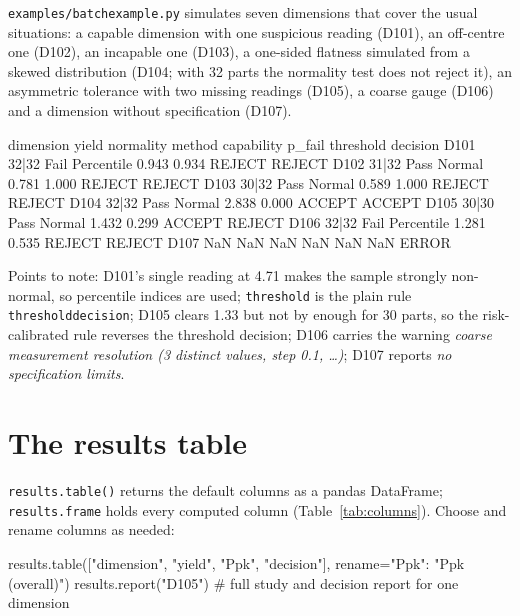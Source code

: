 \documentclass[a4paper,11pt,oneside,openany,parskip=half-,headings=standardclasses,toc=flat,numbers=noenddot]{scrbook}
\newcommand{\code}[1]{\texttt{\begingroup\def\_{\textunderscore\allowbreak}#1\endgroup}}
\newcommand{\tabref}[1]{Table~\ref{#1}}
\newcommand{\msg}[1]{\textit{#1}}
\begin{document}
\code{examples/batch\_example.py} simulates seven dimensions that cover the usual situations: a capable
dimension with one suspicious reading (D101), an off-centre one (D102), an incapable one (D103), a
one-sided flatness simulated from a skewed distribution (D104; with 32 parts the normality test does not reject it), an asymmetric tolerance with two missing readings (D105), a coarse gauge (D106) and a
dimension without specification (D107).

\begin{outbox}
dimension yield normality     method  capability  p_fail threshold decision
     D101 32|32      Fail Percentile       0.943   0.934    REJECT   REJECT
     D102 31|32      Pass     Normal       0.781   1.000    REJECT   REJECT
     D103 30|32      Pass     Normal       0.589   1.000    REJECT   REJECT
     D104 32|32      Pass     Normal       2.838   0.000    ACCEPT   ACCEPT
     D105 30|30      Pass     Normal       1.432   0.299    ACCEPT   REJECT
     D106 32|32      Fail Percentile       1.281   0.535    REJECT   REJECT
     D107   NaN       NaN        NaN         NaN     NaN       NaN    ERROR
\end{outbox}

Points to note: D101's single reading at 4.71 makes the sample strongly non-normal, so percentile indices are
used; \code{threshold} is the plain rule \code{threshold\_decision}; D105 clears 1.33 but not by enough for 30 parts, so the risk-calibrated rule reverses the threshold
decision; D106 carries the warning \msg{coarse measurement resolution (3 distinct values, step 0.1, \ldots)};
D107 reports \msg{no specification limits}.

\section{The results table}

\code{results.table()} returns the default columns as a pandas DataFrame; \code{results.frame} holds every
computed column (\tabref{tab:columns}). Choose and rename columns as needed:

\begin{pycode}
results.table(["dimension", "yield", "Ppk", "decision"], rename={"Ppk": "Ppk (overall)"})
results.report("D105")        # full study and decision report for one dimension
\end{pycode}
\end{document}
